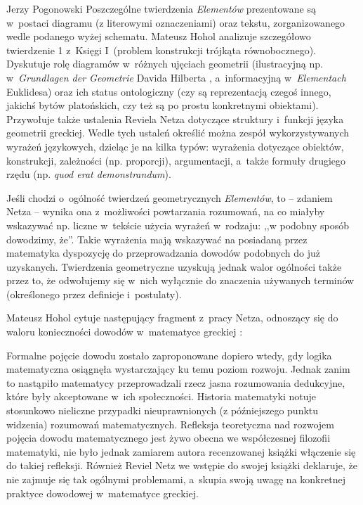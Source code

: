 \begin{newrevplenv}{Jerzy Pogonowski}
Poszczególne twierdzenia {\em Elementów} prezentowane są w~postaci
diagramu (z literowymi oznaczeniami) oraz tekstu, zorganizowanego
wedle podanego wyżej schematu. Mateusz Hohol analizuje szczegółowo
twierdzenie 1 z~Księgi I~(problem konstrukcji trójkąta
równobocznego). Dyskutuje rolę diagramów w~różnych ujęciach
geometrii (ilustracyjną np. w~{\em Grundlagen der Geometrie}
Davida Hilberta \parencite{hilbert_grundlagen_1899}, a~informacyjną w~{\em Elementach}
Euklidesa) oraz ich status ontologiczny (czy są reprezentacją
czegoś innego, jakichś bytów platońskich, czy też są po prostu
konkretnymi obiektami). Przywołuje także ustalenia Reviela Netza
dotyczące struktury i~funkcji języka geometrii greckiej. Wedle
tych ustaleń określić można zespół wykorzystywanych wyrażeń
językowych, dzieląc je na kilka typów: wyrażenia dotyczące
obiektów, konstrukcji, zależności (np. proporcji), argumentacji, a~także formuły drugiego rzędu (np. {\em quod erat demonstrandum}).

Jeśli chodzi o~ogólność twierdzeń geometrycznych {\em Elementów},
to -- zdaniem Netza -- wynika ona z~możliwości powtarzania
rozumowań, na co miałyby wskazywać np. liczne w~tekście użycia
wyrażeń w~rodzaju: ,,w podobny sposób dowodzimy, że''. Takie
wyrażenia mają wskazywać na posiadaną przez matematyka dyspozycję
do przeprowadzania dowodów podobnych do już uzyskanych.
Twierdzenia geometryczne uzyskują jednak walor ogólności także
przez to, że odwołujemy się w~nich wyłącznie do znaczenia
używanych terminów (określonego przez definicje i~postulaty).

Mateusz Hohol cytuje następujący fragment z~pracy Netza, odnoszący
się do waloru konieczności dowodów w~matematyce greckiej \parencite[s.~215]{netz_shaping_1999}:


Formalne pojęcie dowodu zostało zaproponowane dopiero wtedy, gdy
logika matematyczna osiągnęła wystarczający ku temu poziom
rozwoju. Jednak zanim to nastąpiło matematycy przeprowadzali rzecz
jasna rozumowania dedukcyjne, które były akceptowane w~ich
społeczności. Historia matematyki notuje stosunkowo nieliczne
przypadki nieuprawnionych (z późniejszego punktu widzenia)
rozumowań matematycznych. Refleksja teoretyczna nad rozwojem
pojęcia dowodu matematycznego jest żywo obecna we współczesnej
filozofii matematyki, nie było jednak zamiarem autora recenzowanej
książki włączenie się do takiej refleksji. Również Reviel Netz we
wstępie do swojej książki deklaruje, że nie zajmuje się tak
ogólnymi problemami, a~skupia swoją uwagę na konkretnej praktyce
dowodowej w~matematyce greckiej.


\end{newrevplenv}
